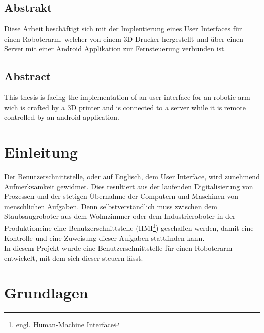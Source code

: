 \documentclass[12pt,					%
							 oneside,			%
							 a4paper,			%
							 halfparskip,		%
							 liststotoc,			%
							 bibtotoc,			%
							 fleqn,				%
							 pointlessnumbers]	%
							 {scrreprt}
\begin{document}
	\onehalfspacing 					%
	

	
\section*{Abstrakt}
Diese Arbeit beschäftigt sich mit der Implentierung eines User Interfaces für einen Roboterarm, welcher von einem 3D Drucker hergestellt und über einen Server mit einer Android Applikation zur Fernsteuerung verbunden ist.
\section*{Abstract}
This thesis is facing the implementation of an user interface for an robotic arm wich is crafted by a 3D printer and is connected to a server while it is remote controlled by an android application.
\tableofcontents
{} 					%

\chapter{Einleitung}
Der Benutzerschnittstelle, oder auf Englisch, dem \glqq{}User Interface\grqq{}, wird zunehmend Aufmerksamkeit gewidmet. Dies resultiert aus der laufenden Digitalisierung von Prozessen und der stetigen Übernahme der Computern und Maschinen von menschlichen Aufgaben. Denn selbstverständlich muss zwischen dem Staubsaugroboter aus dem Wohnzimmer oder dem Industrieroboter in der Produktioneine eine Benutzerschnittstelle (HMI\footnote{engl. Human-Machine Interface}) geschaffen werden, damit eine Kontrolle und eine Zuweisung dieser Aufgaben stattfinden kann. \\
In diesem Projekt wurde eine Benutzerschnittstelle für einen Roboterarm entwickelt, mit dem sich dieser steuern lässt. 
\chapter{Grundlagen}
\end{document}
